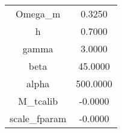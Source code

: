 \begin{table}\centering\begin{tabular}{cc}
Omega_m & 0.3250 \\
h & 0.7000 \\
gamma & 3.0000 \\
beta & 45.0000 \\
alpha & 500.0000 \\
M_tcalib & -0.0000 \\
scale_fparam & -0.0000 \\
\end{tabular}\end{table}